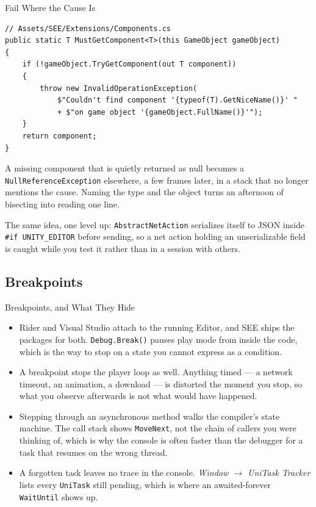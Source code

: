 \begin{frame}[fragile]{Fail Where the Cause Is}
  \begin{lstlisting}[basicstyle=\scriptsize\ttfamily]
// Assets/SEE/Extensions/Components.cs
public static T MustGetComponent<T>(this GameObject gameObject)
{
    if (!gameObject.TryGetComponent(out T component))
    {
        throw new InvalidOperationException(
            $"Couldn't find component '{typeof(T).GetNiceName()}' "
            + $"on game object '{gameObject.FullName()}'");
    }
    return component;
}
  \end{lstlisting}
  \vspace{1ex}

  A missing component that is quietly returned as null becomes a
  \texttt{NullReferenceException} elsewhere, a few frames later, in a stack
  that no longer mentions the cause. Naming the type and the object turns an
  afternoon of bisecting into reading one line.
  \vspace{1ex}

  The same idea, one level up: \texttt{AbstractNetAction} serializes itself to
  JSON inside \texttt{\#if UNITY\_EDITOR} before sending, so a net action
  holding an unserializable field is caught while you test it rather than in
  a session with others.
\end{frame}

\subsection{Breakpoints}

\begin{frame}{Breakpoints, and What They Hide}
  \begin{itemize}
    \item Rider and Visual Studio attach to the running Editor, and SEE ships
      the packages for both. \texttt{Debug.Break()} pauses play mode from
      inside the code, which is the way to stop on a state you cannot express
      as a condition.
    \item A breakpoint stops the player loop as well. Anything timed --- a
      network timeout, an animation, a download --- is distorted the moment
      you stop, so what you observe afterwards is not what would have
      happened.
    \item Stepping through an asynchronous method walks the compiler's state
      machine. The call stack shows \texttt{MoveNext}, not the chain of
      callers you were thinking of, which is why the console is often faster
      than the debugger for a task that resumes on the wrong thread.
    \item A forgotten task leaves no trace in the console. \emph{Window
      $\rightarrow$ UniTask Tracker} lists every \texttt{UniTask} still
      pending, which is where an awaited-forever \texttt{WaitUntil} shows up.
  \end{itemize}
\end{frame}


